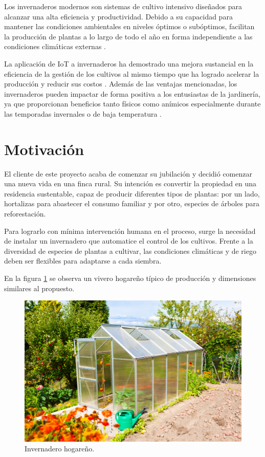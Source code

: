 Los invernaderos modernos son sistemas de cultivo intensivo diseñados para alcanzar una alta eficiencia y productividad. Debido a su capacidad para mantener las condiciones ambientales en niveles óptimos o subóptimos, facilitan la producción de plantas a lo largo de todo el año en forma independiente a las condiciones climáticas externas \citep{HistoryofControlledEnvironmentHorticultureGreenhouses}.

La aplicación de IoT a invernaderos ha demostrado una mejora sustancial en la eficiencia de la gestión de los cultivos al mismo tiempo que ha logrado acelerar la producción y reducir sus costos \citep{IoTparaInvernaderos}. Además de las ventajas mencionadas, los invernaderos pueden impactar de forma positiva a los entusiastas de la jardinería, ya que proporcionan beneficios tanto físicos como anímicos especialmente durante las temporadas invernales o de baja temperatura \citep{GreenHousesForHomeOwnersAndGardeners}. 


\section{Motivación}
\label{Motivación}

El cliente de este proyecto acaba de comenzar su jubilación y decidió comenzar una nueva vida en una finca rural. Su intención es convertir la propiedad en una residencia sustentable, capaz de producir diferentes tipos de plantas: por un lado, hortalizas para abastecer el consumo familiar y por otro, especies de árboles para reforestación. 

Para lograrlo con mínima intervención humana en el proceso, surge la necesidad de instalar un invernadero que automatice el control de los cultivos. Frente a la diversidad de especies de plantas a cultivar, las condiciones climáticas y de riego deben ser flexibles para adaptarse a cada siembra. 

 
En la figura \ref{fig:imgInvernadero} se observa un vivero hogareño típico de producción y dimensiones similares al propuesto.




\begin{figure}[htpb]
\centering 
\includegraphics[width=.7\textwidth]{../Figures/invernadero1.jpg}
\caption[Invernadero hogareño]{Invernadero hogareño\protect\footnotemark.}
\label{fig:imgInvernadero}
\end{figure}



